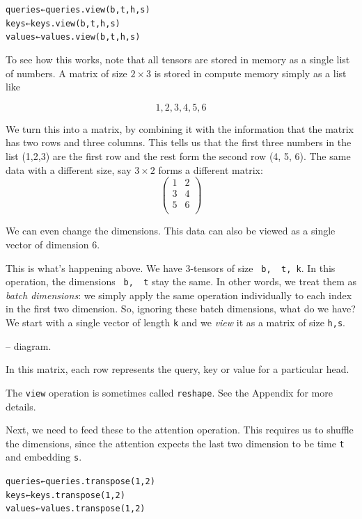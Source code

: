 \documentclass{pca}
\newenvironment{aside}{
	\setlength{\leftskip}{1em}\par\itshape
}{
	
	\setlength{\leftskip}{0em}\par
}
\newcommand{\gc}[1]{{\color{my-green} #1}}
\newcommand{\rc}[1]{{\color{my-red} #1}}
\newcommand{\bc}[1]{{\color{my-blue} #1}}
\theoremstyle{theorem}
\theoremstyle{definition}
\theoremstyle{proof}
\begin{document}
\begin{alltt}
\bc{queries} ← \bc{queries}.view(b, t, h, s)
\gc{keys}    ← \gc{keys}.view(b, t, h, s)
\rc{values}  ← \rc{values}.view(b, t, h, s)	
\end{alltt}

To see how this works, note that all tensors are stored in memory as a single list of numbers. A matrix of size $2 \times 3$ is stored in compute memory simply as a list like

\[
1,2,3,4,5,6
\]

We turn this into a matrix, by combining it with the information that the matrix has two rows and three columns. This tells us that the first three numbers in the list (1,2,3) are the first row and the rest form the second row (4, 5, 6). The same data with a different size, say $3\times 2$ forms a different matrix:
\[
\begin{pmatrix}
	1& 2 \\
	3&4 \\
	5&6 \\
\end{pmatrix}
\]

We can even change the dimensions. This data can also be viewed as a single vector of dimension 6.

This is what's happening above. We have 3-tensors of size \texttt{\gc{b}, \gc{t}, k}. In this operation, the dimensions \texttt{\gc{b}, \gc{t}} stay the same. In other words, we treat them as \emph{batch dimensions}: we simply apply the same operation individually to each index in the first two dimension. So, ignoring these batch dimensions, what do we have? We start with a single vector of length \texttt{k} and we \emph{view} it as a matrix of size \texttt{h,s}.

-- diagram.

In this matrix, each row represents the query, key or value for a particular head.

\begin{aside}
The \texttt{view} operation is sometimes called \texttt{reshape}. See the Appendix for more details.
\end{aside}

Next, we need to feed these to the attention operation. This requires us to shuffle the dimensions, since the attention expects the last two dimension to be time \texttt{t} and embedding \texttt{s}. 

\begin{alltt}
\bc{queries} ← \bc{queries}.transpose(1,2)
\gc{keys}    ← \gc{keys}.transpose(1,2)
\rc{values}  ← \rc{values}.transpose(1,2)
\end{alltt}
\end{document}
